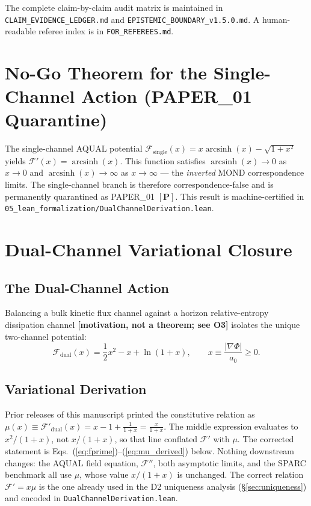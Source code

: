 \documentclass[aps,prd,preprint,superscriptaddress,nofootinbib,amsmath,amssymb,floatfix]{revtex4-2}
\begin{document}
\noindent The complete claim-by-claim audit matrix is maintained in \texttt{CLAIM\_EVIDENCE\_LEDGER.md} and \texttt{EPISTEMIC\_BOUNDARY\_v1.5.0.md}. A human-readable referee index is in \texttt{FOR\_REFEREES.md}.

\section{No-Go Theorem for the Single-Channel Action (PAPER\_01 Quarantine)}
\label{sec:nogo}

The single-channel AQUAL potential $\mathcal{F}_{\text{single}}(x) = x\operatorname{arcsinh}(x) - \sqrt{1+x^2}$ yields $\mathcal{F}'(x) = \operatorname{arcsinh}(x)$. This function satisfies $\operatorname{arcsinh}(x) \to 0$ as $x \to 0$ and $\operatorname{arcsinh}(x) \to \infty$ as $x \to \infty$ --- the \emph{inverted} MOND correspondence limits. The single-channel branch is therefore correspondence-false and is permanently quarantined as PAPER\_01 $\mathbf{[P]}$. This result is machine-certified in \texttt{05\_lean\_formalization/DualChannelDerivation.lean}.

\section{Dual-Channel Variational Closure}
\label{sec:dual_channel}

\subsection{The Dual-Channel Action}

Balancing a bulk kinetic flux channel against a horizon relative-entropy dissipation channel \textbf{[motivation, not a theorem; see O3]} isolates the unique two-channel potential:
\begin{equation}
\label{eq:fdual}
\mathcal{F}_{\text{dual}}(x) = \frac{1}{2}x^2 - x + \ln(1+x), \qquad x \equiv \frac{|\nabla\Phi|}{a_0} \ge 0.
\end{equation}

\subsection{Variational Derivation}

\begin{tcolorbox}[colback=boxbg,colframe=primary,title=\textbf{Correction to v1.5.0 and earlier}]
Prior releases of this manuscript printed the constitutive relation as $\mu(x) \equiv \mathcal{F}'_{\text{dual}}(x) = x-1+\tfrac{1}{1+x} = \tfrac{x}{1+x}$. The middle expression evaluates to $x^2/(1+x)$, not $x/(1+x)$, so that line conflated $\mathcal{F}'$ with $\mu$. The corrected statement is Eqs.~(\ref{eq:fprime})--(\ref{eq:mu_derived}) below. Nothing downstream changes: the AQUAL field equation, $\mathcal{F}''$, both asymptotic limits, and the SPARC benchmark all use $\mu$, whose value $x/(1+x)$ is unchanged. The correct relation $\mathcal{F}' = x\mu$ is the one already used in the D2 uniqueness analysis (\S\ref{sec:uniqueness}) and encoded in \texttt{DualChannelDerivation.lean}.
\end{tcolorbox}
\end{document}
